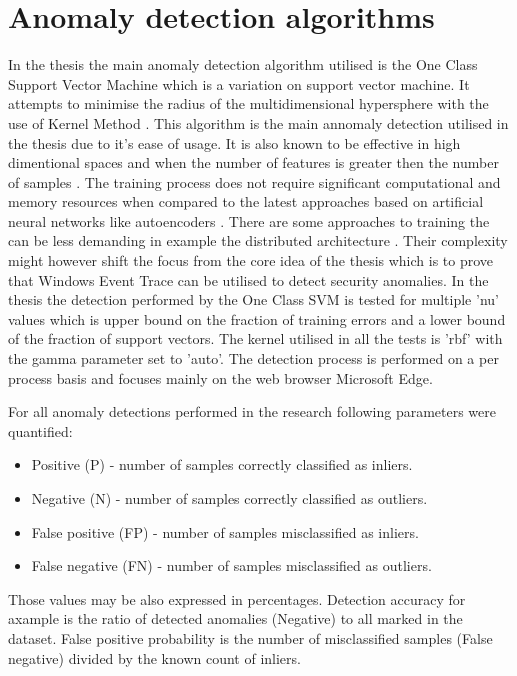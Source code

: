 \documentclass[a4paper,twoside,12pt]{book}
\begin{document}
\section{Anomaly detection algorithms}
In the thesis the main anomaly detection algorithm utilised is the One Class Support 
Vector Machine which is a variation on support vector machine. It attempts to minimise 
the radius of the multidimensional hypersphere with the use of Kernel Method \cite{bib:ocsvm}. 
This algorithm is the main annomaly detection utilised in the thesis due to it's ease of
usage. It is also known to be effective in high dimentional spaces and when 
the number of features is greater then the number of samples \cite{bib:svms}. The training process 
does not require significant computational and memory resources when compared to the latest
approaches based on artificial neural networks like autoencoders \cite{bib:autoencoder}. There are
some approaches to training the can be less demanding in example the distributed architecture
\cite{bib:autoencoderDist}. Their complexity might however shift the focus from the core idea 
of the thesis which is to prove that Windows Event Trace can be utilised to detect security
anomalies. In the thesis the detection performed by the One Class SVM is tested for multiple 'nu'
values which is upper bound on the fraction of training errors and a lower bound of the 
fraction of support vectors\cite{bib:skocsvm}. The kernel utilised in all the tests is 'rbf' with
the gamma parameter set to 'auto'. The detection process is performed 
on a per process basis and focuses mainly on the web browser Microsoft Edge. 

For all anomaly detections performed in the research following parameters were quantified:
\begin{itemize}
	\item Positive (P) - number of samples correctly classified as inliers.
	\item Negative (N) - number of samples correctly classified as outliers.
	\item False positive (FP) - number of samples misclassified as inliers. 
	\item False negative (FN) - number of samples misclassified as outliers.
\end{itemize}

Those values may be also expressed in percentages. Detection accuracy for axample is the ratio
of detected anomalies (Negative) to all marked in the dataset. False positive probability is 
the number of misclassified samples (False negative) divided by the known count of inliers.  
\end{document}
